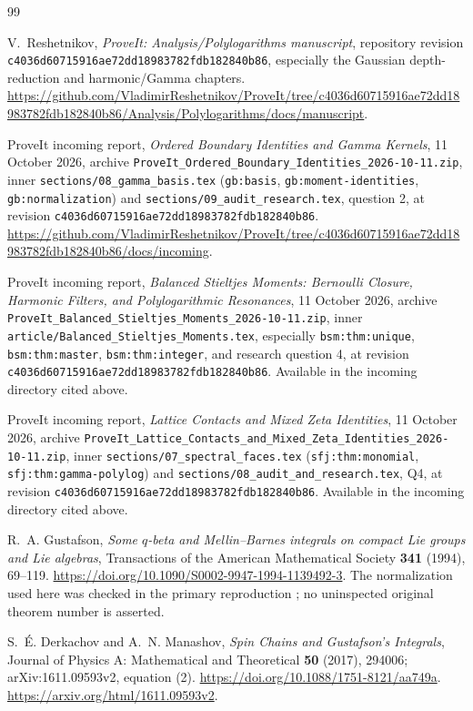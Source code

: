 \documentclass[11pt,a4paper]{article}
\numberwithin{equation}{section}
\theoremstyle{definition}
\theoremstyle{remark}
\newcommand{\src}[1]{\nolinkurl{#1}}
\newcommand{\pin}{\src{c4036d60715916ae72dd18983782fdb182840b86}}
\begin{document}
\clearpage
\begin{thebibliography}{99}
\small\raggedright
{}

V.~Reshetnikov, \emph{ProveIt: Analysis/Polylogarithms manuscript},
repository revision \pin, especially the Gaussian depth-reduction
and harmonic/Gamma chapters.
\url{https://github.com/VladimirReshetnikov/ProveIt/tree/c4036d60715916ae72dd18983782fdb182840b86/Analysis/Polylogarithms/docs/manuscript}.

ProveIt incoming report,
\emph{Ordered Boundary Identities and Gamma Kernels},
11 October 2026,
archive \src{ProveIt_Ordered_Boundary_Identities_2026-10-11.zip},
inner \src{sections/08_gamma_basis.tex}
(\src{gb:basis}, \src{gb:moment-identities}, \src{gb:normalization})
and \src{sections/09_audit_research.tex}, question 2,
at revision \pin.
\url{https://github.com/VladimirReshetnikov/ProveIt/tree/c4036d60715916ae72dd18983782fdb182840b86/docs/incoming}.

ProveIt incoming report,
\emph{Balanced Stieltjes Moments: Bernoulli Closure, Harmonic Filters,
and Polylogarithmic Resonances},
11 October 2026,
archive \src{ProveIt_Balanced_Stieltjes_Moments_2026-10-11.zip},
inner \src{article/Balanced_Stieltjes_Moments.tex},
especially \src{bsm:thm:unique}, \src{bsm:thm:master},
\src{bsm:thm:integer}, and research question 4,
at revision \pin.
Available in the incoming directory cited above.

ProveIt incoming report,
\emph{Lattice Contacts and Mixed Zeta Identities},
11 October 2026,
archive
\src{ProveIt_Lattice_Contacts_and_Mixed_Zeta_Identities_2026-10-11.zip},
inner \src{sections/07_spectral_faces.tex}
(\src{sfj:thm:monomial}, \src{sfj:thm:gamma-polylog})
and \src{sections/08_audit_and_research.tex}, Q4,
at revision \pin.
Available in the incoming directory cited above.

R.~A. Gustafson,
\emph{Some $q$-beta and Mellin--Barnes integrals on compact Lie groups
and Lie algebras},
Transactions of the American Mathematical Society \textbf{341}
(1994), 69--119.
\url{https://doi.org/10.1090/S0002-9947-1994-1139492-3}.
The normalization used here was checked in the primary reproduction
\cite[equation (2)]{derkachov2017}; no uninspected original theorem
number is asserted.

S.~\'E. Derkachov and A.~N. Manashov,
\emph{Spin Chains and Gustafson's Integrals},
Journal of Physics A: Mathematical and Theoretical \textbf{50}
(2017), 294006; arXiv:1611.09593v2, equation (2).
\url{https://doi.org/10.1088/1751-8121/aa749a}.
\url{https://arxiv.org/html/1611.09593v2}.


\end{thebibliography}
\end{document}
